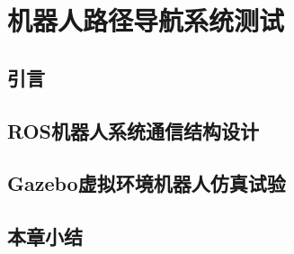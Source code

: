 \chapter{机器人路径导航系统测试}
%

\section{引言}
\section{ROS机器人系统通信结构设计}
\section{Gazebo虚拟环境机器人仿真试验}
\section{本章小结}


